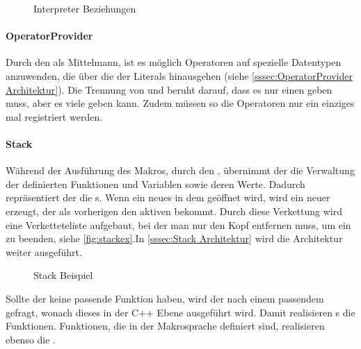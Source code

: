       \begin{figure}[H]
        \centering
        \caption{Interpreter Beziehungen}
        \label{fig:interpreterpackuml}
      \end{figure}

      \paragraph{OperatorProvider}
        Durch den  als Mittelmann, ist es möglich Operatoren auf spezielle Datentypen anzuwenden, die über die der Literals hinausgehen (siehe \autoref{sssec:OperatorProvider Architektur}). Die Trennung von  und  beruht darauf, dass es nur einen  geben muss, aber es viele  geben kann. Zudem müssen so die Operatoren nur ein einziges mal registriert werden.

      \paragraph{Stack}
        Während der Ausführung des Makros, durch den , übernimmt der  die Verwaltung der definierten Funktionen und Variablen sowie deren Werte. Dadurch repräsentiert der  die s. Wenn ein neues  in dem  geöffnet wird, wird ein neuer  erzeugt, der als vorherigen  den aktiven  bekommt. Durch diese Verkettung wird eine Verketteteliste aufgebaut, bei der man nur den Kopf entfernen muss, um ein  zu beenden, siehe \autoref{fig:stackex}.In \autoref{sssec:Stack Architektur} wird die Architektur weiter ausgeführt.
        \begin{figure}[H]
          \centering
          \caption{Stack Beispiel}
          \label{fig:stackex}
        \end{figure}

        Sollte der  keine passende Funktion haben, wird der  nach einem passendem  gefragt, wonach dieses in der C++ Ebene ausgeführt wird. Damit realisieren s die  Funktionen. Funktionen, die in der Makrosprache definiert sind, realisieren ebenso die .

